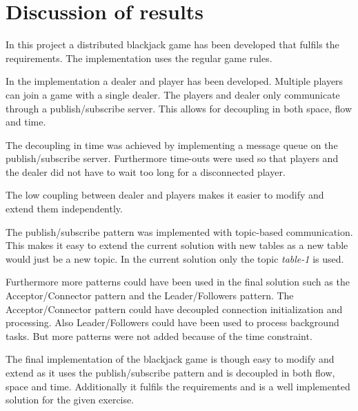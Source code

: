 \chapter{Discussion of results}
In this project a distributed blackjack game has been developed that fulfils the requirements. The implementation uses the regular game rules.

In the implementation a dealer and player has been developed. Multiple players can join a game with a single dealer. The players and dealer only communicate through a publish/subscribe server. This allows for decoupling in both space, flow and time.

The decoupling in time was achieved by implementing a message queue on the publish/subscribe server. Furthermore time-outs were used so that players and the dealer did not have to wait too long for a disconnected player.

The low coupling between dealer and players makes it easier to modify and extend them independently. 

The publish/subscribe pattern was implemented with topic-based communication. This makes it easy to extend the current solution with new tables as a new table would just be a new topic. In the current solution only the topic \emph{table-1} is used.

Furthermore more patterns could have been used in the final solution such as the Acceptor/Connector pattern and the Leader/Followers pattern. The Acceptor/Connector pattern could have decoupled connection initialization and processing. Also Leader/Followers could have been used to process background tasks. But more patterns were not added because of the time constraint. 

The final implementation of the blackjack game is though easy to modify and extend as it uses the publish/subscribe pattern and is decoupled in both flow, space and time. Additionally it fulfils the requirements and is a well implemented solution for the given exercise.
 